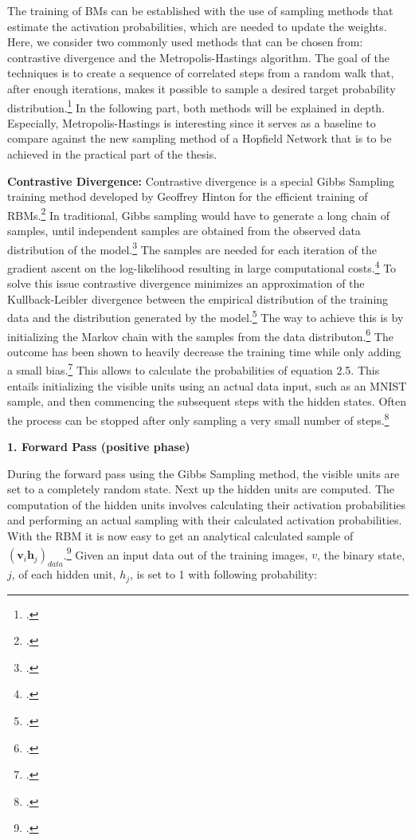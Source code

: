 The training of \ac{BM}s can be established with the use of sampling methods that estimate the activation probabilities, which are needed to update the weights.
Here, we consider two commonly used methods that can be chosen from: contrastive divergence and the Metropolis-Hastings algorithm. 
The goal of the techniques is to create a sequence of correlated steps from a random walk that, after enough iterations, makes it possible to sample a desired target probability distribution.\footcite[cf.][1]{patronOptimalRelaxationRate2024}
In the following part, both methods will be explained in depth.
Especially, Metropolis-Hastings is interesting since it serves as a baseline to compare against the new sampling method of a Hopfield Network that is to be achieved in the practical part of the thesis.

\textbf{Contrastive Divergence:} Contrastive divergence is a special Gibbs Sampling training method
developed by Geoffrey Hinton for the efficient training of \ac{RBM}s.\footcite[cf.][4-5]{hintonPracticalGuideTraining2012}
In traditional, Gibbs sampling would have to generate a long chain of samples, until
independent samples are obtained from the observed data distribution of the model.\footcite[cf.][5-6]{huembeliPhysicsEnergybasedModels2022}
The samples are needed for each iteration of the gradient ascent on the log-likelihood
resulting in large computational costs.\footcite[cf.][7-8]{upadhyaOverviewRestrictedBoltzmann2019}
To solve this issue contrastive divergence minimizes an approximation of the Kullback-Leibler divergence between the empirical distribution of the training data and the distribution generated by the model.\footcite[cf.][246]{mocanuTopologicalInsightRestricted2016}
The way to achieve this is by initializing the Markov chain with the samples from the data distributon.\footcite[cf.][7-8]{upadhyaOverviewRestrictedBoltzmann2019}
The outcome has been shown to heavily decrease the training time while only adding a small bias.\footcite[cf.][537]{larochelleClassificationUsingDiscriminative2008}
This allows to calculate the probabilities of equation 2.5. 
This entails initializing the visible units using an actual data input, such as an MNIST sample, and then commencing the subsequent steps with the hidden states.
Often the process can be stopped after only sampling a very small number of steps.\footcite[cf.][646]{larochelleLearningAlgorithmsClassification2012}


\textbf{1. Forward Pass (positive phase)}

During the forward pass using the Gibbs Sampling method, the visible units are set to a completely random state. Next up the hidden units are computed.
The computation of the hidden units involves calculating their activation probabilities and performing an actual sampling with their calculated activation probabilities.
With the \ac{RBM} it is now easy to get an analytical calculated sample of $(\textbf{v}_i\textbf{h}_j)_{data}$.\footcite[cf.][5]{hintonPracticalGuideTraining2012}
Given an input data out of the training images, \( v \), the binary state, \( j \), of each hidden unit,  \( h_j \), is set to 1 with following probability:

